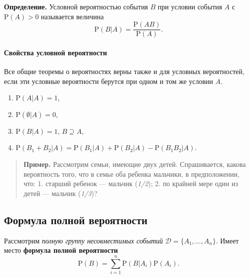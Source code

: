 \documentclass[11pt,a4paper]{article}
\providecommand{\tightlist}{%
      \setlength{\itemsep}{0pt}\setlength{\parskip}{0pt}}
\begin{document}
\textbf{Определение.} Условной вероятностью события \(B\) при условии
события \(A\) с \(\mathrm{P}(A)>0\) называется величина
\[ \mathrm{P}(B|A) = \dfrac{\mathrm{P}(AB)}{\mathrm{P}(A)}. \]

    \hypertarget{ux441ux432ux43eux439ux441ux442ux432ux430-ux443ux441ux43bux43eux432ux43dux43eux439-ux432ux435ux440ux43eux44fux442ux43dux43eux441ux442ux438}{%
\paragraph{Свойства условной
вероятности}\label{ux441ux432ux43eux439ux441ux442ux432ux430-ux443ux441ux43bux43eux432ux43dux43eux439-ux432ux435ux440ux43eux44fux442ux43dux43eux441ux442ux438}}

Все общие теоремы о вероятностях верны также и для условных
вероятностей, если эти условные вероятности берутся при одном и том же
условии \(A\).

\begin{enumerate}
\def\labelenumi{\arabic{enumi}.}
\tightlist
\item
  \(\mathrm{P}(A|A) = 1\),
\item
  \(\mathrm{P}(\emptyset|A) = 0\),
\item
  \(\mathrm{P}(B|A) = 1\), \(B \supseteq A\),
\item
  \(\mathrm{P}(B_1 + B_2|A) = \mathrm{P}(B_1|A) + \mathrm{P}(B_2|A) - \mathrm{P}(B_1 B_2|A)\).
\end{enumerate}

\begin{quote}
\textbf{Пример.} Рассмотрим семьи, имеющие двух детей. Спрашивается,
какова вероятность того, что в семье оба ребенка мальчики, в
предположении, что: 1. старший ребенок --- мальчик (\emph{1/2}); 2. по
крайней мере один из детей --- мальчик (\emph{1/3})?
\end{quote}

    \hypertarget{ux444ux43eux440ux43cux443ux43bux430-ux43fux43eux43bux43dux43eux439-ux432ux435ux440ux43eux44fux442ux43dux43eux441ux442ux438}{%
\subsection{Формула полной
вероятности}\label{ux444ux43eux440ux43cux443ux43bux430-ux43fux43eux43bux43dux43eux439-ux432ux435ux440ux43eux44fux442ux43dux43eux441ux442ux438}}

Рассмотрим \emph{полную группу несовместимых событий}
\(\mathcal{D} = \{A_1, \dots, A_n\}\). Имеет место \textbf{формула
полной вероятности}
\[ \mathrm{P}(B) = \sum_{i=1}^n \mathrm{P}(B|A_i) \mathrm{P}(A_i). \]
\end{document}
